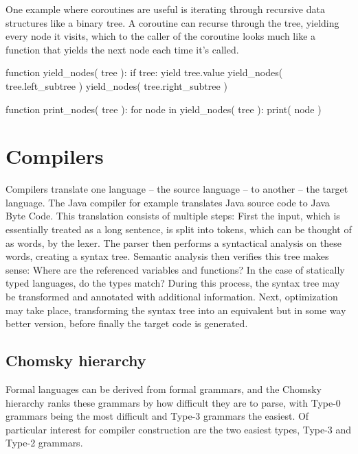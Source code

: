 		One example where coroutines are useful is iterating through recursive data structures like a binary tree. A coroutine can recurse through the tree, yielding every node it visits, which to the caller of the coroutine looks much like a function that yields the next node each time it's called.
		
		\begin{codelisting}[caption={Pseudocode of tree iteration using coroutines}]
function yield_nodes( tree ):
    if tree:
        yield tree.value
        yield_nodes( tree.left_subtree )
        yield_nodes( tree.right_subtree )

function print_nodes( tree ):
    for node in yield_nodes( tree ):
        print( node )
		\end{codelisting}
	
	\section{Compilers}
	
	
		Compilers translate one language -- the source language -- to another -- the target language. The Java compiler for example translates Java source code to Java Byte Code. This translation consists of multiple steps: First the input, which is essentially treated as a long sentence, is split into tokens, which can be thought of as words, by the lexer. The parser then performs a syntactical analysis on these words, creating a syntax tree. Semantic analysis then verifies this tree makes sense: Where are the referenced variables and functions? In the case of statically typed languages, do the types match? During this process, the syntax tree may be transformed and annotated with additional information. Next, optimization may take place, transforming the syntax tree into an equivalent but in some way better version, before finally the target code is generated.

		\subsection{Chomsky hierarchy}
			
			Formal languages can be derived from formal grammars, and the Chomsky hierarchy ranks these grammars by how difficult they are to parse, with Type-0 grammars being the most difficult and Type-3 grammars the easiest. Of particular interest for compiler construction are the two easiest types, Type-3 and Type-2 grammars.
			
